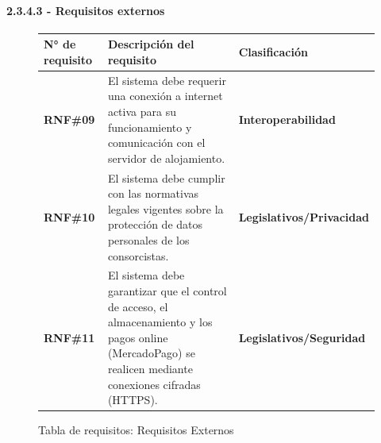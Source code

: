 \paragraph{2.3.4.3 - Requisitos externos}

\begin{figure}[H]
    \centering
    \begin{tabularx}{\textwidth}{|l|X|l|}
    \hline
        
            \textbf{N° de requisito} 
        
        & 
        
            \textbf{Descripción del requisito} 
        
        & 
        
            \textbf{Clasificación} 
        
    \\ \hline
    
            \textbf{RNF\#09} 
        
        & 
        
            El sistema debe requerir una conexión a internet activa para su funcionamiento y comunicación con el servidor de alojamiento. 
        
        & 
        
            \textbf{Interoperabilidad} 
        
    \\ \hline
    
            \textbf{RNF\#10} 
        
        & 
        
            El sistema debe cumplir con las normativas legales vigentes sobre la protección de datos personales de los consorcistas. 
        
        & 
        
            \textbf{Legislativos/Privacidad} 
        
    \\ \hline
    
            \textbf{RNF\#11} 
        
        & 
        
            El sistema debe garantizar que el control de acceso, el almacenamiento y los pagos online (MercadoPago) se realicen mediante conexiones cifradas (HTTPS). 
        
        & 
        
            \textbf{Legislativos/Seguridad} 
        
    \\ \hline
    \end{tabularx}
    \caption{Tabla de requisitos: Requisitos Externos}
\end{figure}
